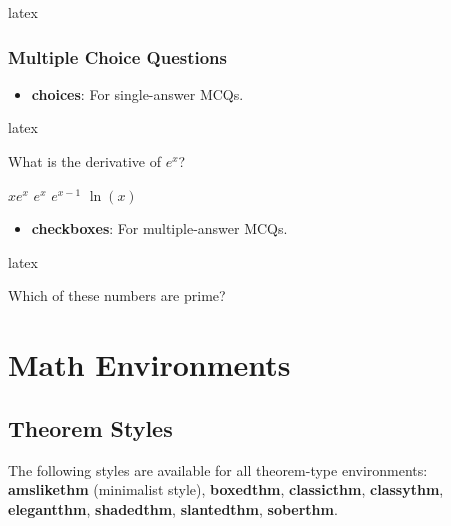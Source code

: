\documentclass[
    margin=2cm
]{neoschool}
\begin{document}
\begin{code}{latex}
\end{code}

\subsubsection{Multiple Choice Questions}

\begin{itemize}
\item
  \textbf{choices}: For single-answer MCQs.
\end{itemize}

\begin{code}{latex}
\begin{exercise}[points=2,ID=mcq01]
    What is the derivative of $e^x$?
    \begin{choices}
        \choice $x e^x$
        \choice[\correct] $e^x$
        \choice $e^{x-1}$
        \choice $\ln(x)$
    \end{choices}
\end{exercise}
\end{code}

\begin{itemize}
\item
  \textbf{checkboxes}: For multiple-answer MCQs.
\end{itemize}

\begin{code}{latex}
\begin{exercise}[points=3,ID=mcq02]
    Which of these numbers are prime?
    \begin{checkboxes}
    \end{checkboxes}
\end{exercise}
\end{code}

\section{Math Environments}

\subsection{Theorem Styles}

The following styles are available for all theorem-type environments:
\textbf{amslikethm} (minimalist style), \textbf{boxedthm},
\textbf{classicthm}, \textbf{classythm}, \textbf{elegantthm},
\textbf{shadedthm}, \textbf{slantedthm}, \textbf{soberthm}.
\end{document}
